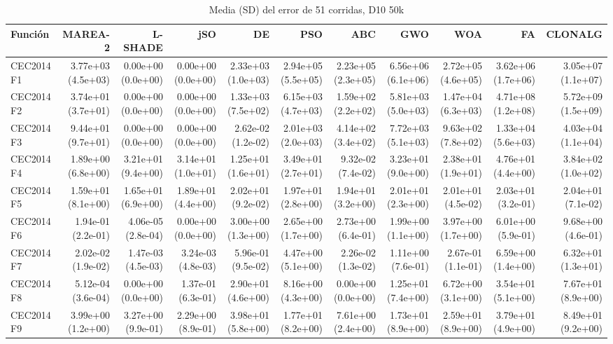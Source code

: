 \begin{longtable}{lrrrrrrrrrr}
\caption{Media (SD) del error de 51 corridas, D10 50k}\\
\toprule
Función & MAREA-2 & L-SHADE & jSO & DE & PSO & ABC & GWO & WOA & FA & CLONALG \\
\midrule
\endhead
CEC2014 F1 & 3.77e+03 (4.5e+03) & 0.00e+00 (0.0e+00) & 0.00e+00 (0.0e+00) & 2.33e+03 (1.0e+03) & 2.94e+05 (5.5e+05) & 2.23e+05 (2.3e+05) & 6.56e+06 (6.1e+06) & 2.72e+05 (4.6e+05) & 3.62e+06 (1.7e+06) & 3.05e+07 (1.1e+07) \\
CEC2014 F2 & 3.74e+01 (3.7e+01) & 0.00e+00 (0.0e+00) & 0.00e+00 (0.0e+00) & 1.33e+03 (7.5e+02) & 6.15e+03 (4.7e+03) & 1.59e+02 (2.2e+02) & 5.81e+03 (5.0e+03) & 1.47e+04 (6.3e+03) & 4.71e+08 (1.2e+08) & 5.72e+09 (1.5e+09) \\
CEC2014 F3 & 9.44e+01 (9.7e+01) & 0.00e+00 (0.0e+00) & 0.00e+00 (0.0e+00) & 2.62e-02 (1.2e-02) & 2.01e+03 (2.0e+03) & 4.14e+02 (3.4e+02) & 7.72e+03 (5.1e+03) & 9.63e+02 (7.8e+02) & 1.33e+04 (5.6e+03) & 4.03e+04 (1.1e+04) \\
CEC2014 F4 & 1.89e+00 (6.8e+00) & 3.21e+01 (9.4e+00) & 3.14e+01 (1.0e+01) & 1.25e+01 (1.6e+01) & 3.49e+01 (2.7e+01) & 9.32e-02 (7.4e-02) & 3.23e+01 (9.0e+00) & 2.38e+01 (1.9e+01) & 4.76e+01 (4.4e+00) & 3.84e+02 (1.0e+02) \\
CEC2014 F5 & 1.59e+01 (8.1e+00) & 1.65e+01 (6.9e+00) & 1.89e+01 (4.4e+00) & 2.02e+01 (9.2e-02) & 1.97e+01 (2.8e+00) & 1.94e+01 (3.2e+00) & 2.01e+01 (2.3e+00) & 2.01e+01 (4.5e-02) & 2.03e+01 (3.2e-01) & 2.04e+01 (7.1e-02) \\
CEC2014 F6 & 1.94e-01 (2.2e-01) & 4.06e-05 (2.8e-04) & 0.00e+00 (0.0e+00) & 3.00e+00 (1.3e+00) & 2.65e+00 (1.7e+00) & 2.73e+00 (6.4e-01) & 1.99e+00 (1.1e+00) & 3.97e+00 (1.7e+00) & 6.01e+00 (5.9e-01) & 9.68e+00 (4.6e-01) \\
CEC2014 F7 & 2.02e-02 (1.9e-02) & 1.47e-03 (4.5e-03) & 3.24e-03 (4.8e-03) & 5.96e-01 (9.5e-02) & 4.47e+00 (5.1e+00) & 2.26e-02 (1.3e-02) & 1.11e+00 (7.6e-01) & 2.67e-01 (1.1e-01) & 6.59e+00 (1.4e+00) & 6.32e+01 (1.3e+01) \\
CEC2014 F8 & 5.12e-04 (3.6e-04) & 0.00e+00 (0.0e+00) & 1.37e-01 (6.3e-01) & 2.90e+01 (4.6e+00) & 8.16e+00 (4.3e+00) & 0.00e+00 (0.0e+00) & 1.25e+01 (7.4e+00) & 6.72e+00 (3.1e+00) & 3.54e+01 (5.1e+00) & 7.67e+01 (8.9e+00) \\
CEC2014 F9 & 3.99e+00 (1.2e+00) & 3.27e+00 (9.9e-01) & 2.29e+00 (8.9e-01) & 3.98e+01 (5.8e+00) & 1.77e+01 (8.2e+00) & 7.61e+00 (2.4e+00) & 1.73e+01 (8.9e+00) & 2.59e+01 (8.9e+00) & 3.79e+01 (4.9e+00) & 8.49e+01 (9.2e+00) \\

\end{longtable}
